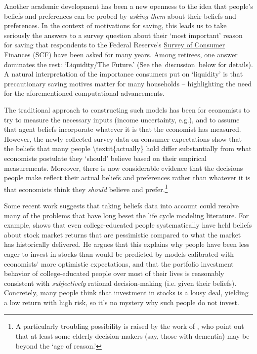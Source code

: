\documentclass{article}
\begin{document}
Another academic development has been a new openness to the idea that people's beliefs and preferences can be probed by \textit{asking them} about their beliefs and preferences.
In the context of motivations for saving, this leads us to take seriously the answers to a survey question about their `most important' reason for saving that respondents to the Federal Reserve's \href{https://www.federalreserve.gov/econres/scfindex.htm}{Survey of Consumer Finances (SCF)} have been asked for many years.
Among retirees, one answer dominates the rest: `Liquidity/The Future.'  (See the~discussion~below for details).
A natural interpretation of the importance consumers put on `liquidity' is that precautionary saving motives matter for many households -- highlighting the need for the aforementioned computational advancements.

The traditional approach to constructing such models has been for economists to try to measure the necessary inputs (income uncertainty, e.g.), and to assume that agent beliefs incorporate whatever it is that the economist has measured.
However, the newly collected survey data on consumer expectations show that the beliefs that many people {\textbackslash}textit\{actually\} hold differ substantially from what economists postulate they `should' believe based on their empirical measurements.
Moreover, there is now considerable evidence that the decisions people make reflect their actual beliefs and preferences rather than whatever it is that economists think they \textit{should} believe and prefer.\footnote{A particularly troubling possibility is raised by the work of \cite{gabaix2010age}, who point out that at least some elderly decision-makers (say, those with dementia) may be beyond the `age of reason.'}


Some recent work suggests that taking beliefs data into account could resolve many of the problems that have long beset the life cycle modeling literature.
For example, \cite{velasquezgiraldoJMP} shows that even college-educated people systematically have held beliefs about stock market returns that are pessimistic compared to what the market has historically delivered.
He argues that this explains why people have been less eager to invest in stocks than would be predicted by models calibrated with economists' more optimistic expectations, and that the portfolio investment behavior of college-educated people over most of their lives is reasonably consistent with \textit{subjectively} rational decision-making (i.e. given their beliefs).
Concretely, many people think that investment in stocks is a lousy deal, yielding a low return with high risk, so it's no mystery why such people do not invest.
\end{document}
